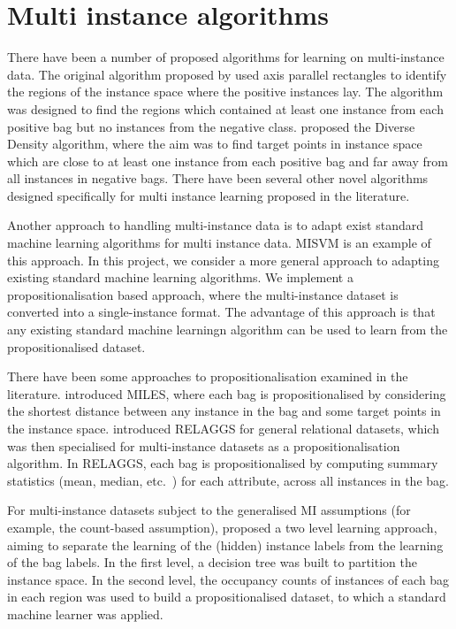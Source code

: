\documentclass[a4paper,12pt]{report} %
\begin{document}
    
\section{Multi instance algorithms}

There have been a number of proposed algorithms 
    for learning on multi-instance data. 
The original algorithm proposed by  
    used axis parallel rectangles to identify the regions of the instance space 
    where the positive instances lay. 
The algorithm was designed to find the regions which 
    contained at least one instance from each positive bag 
    but no instances from the negative class. 
 proposed the Diverse Density algorithm, 
    where the aim was to find target points in instance space 
    which are close to at least one instance from each positive bag and 
    far away from all instances in negative bags.
There have been several other novel algorithms 
    designed specifically for multi instance learning
    proposed in the literature.
    
Another approach to handling multi-instance data is to 
    adapt exist standard machine learning algorithms for
    multi instance data.
MISVM \cite{misvm} is an example of this approach.
In this project, we consider a more general approach
    to adapting existing standard machine learning algorithms.
We implement a propositionalisation based approach, 
    where the multi-instance dataset is converted into a single-instance format.
The advantage of this approach is that any existing standard machine learningn algorithm 
    can be used to learn from the propositionalised dataset.
    
There have been some approaches to propositionalisation examined in the literature.
 introduced MILES, 
    where each bag is propositionalised by considering the shortest distance between
    any instance in the bag and some target points in the instance space.
 introduced RELAGGS for general relational datasets,
    which was then specialised for multi-instance datasets as a propositionalisation algorithm.
In RELAGGS, each bag is propositionalised by 
    computing summary statistics (mean, median, etc.\ ) for each attribute, 
    across all instances in the bag.
    
For multi-instance datasets subject to the generalised MI assumptions 
    (for example, the count-based assumption), 
     proposed a two level learning approach, 
    aiming to separate the learning of the (hidden) instance labels from
    the learning of the bag labels.
In the first level, 
    a decision tree was built to partition the instance space. 
In the second level, 
    the occupancy counts of instances of each bag in each region 
    was used to build a propositionalised dataset, 
    to which a standard machine learner was applied.
    
\end{document}
